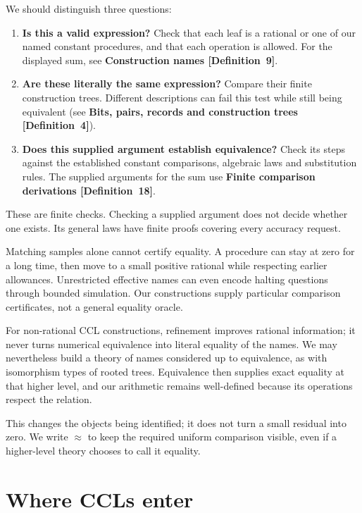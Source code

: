 \documentclass[11pt]{article}
\newcommand{\entryname}[3]{\textbf{#3 \mbox{[#1~#2]}}}
\begin{document}
\begingroup\samepage
We should distinguish three questions:
\begin{enumerate}
\item \textbf{Is this a valid expression?} Check that each leaf is a rational
or one of our named constant procedures, and that each operation is allowed.
For the displayed sum, see \entryname{Definition}{9}{Construction names}.
\item \textbf{Are these literally the same expression?} Compare their finite
construction trees. Different descriptions can fail this test while still
being equivalent (see \entryname{Definition}{4}{Bits, pairs, records and construction trees}).
\item \textbf{Does this supplied argument establish equivalence?} Check its
steps against the established constant comparisons, algebraic laws and
substitution rules. The supplied arguments for the sum use
\entryname{Definition}{18}{Finite comparison derivations}.
\end{enumerate}
\par\endgroup
These are finite checks. Checking a supplied argument does not decide
whether one exists. Its general laws have finite proofs covering every
accuracy request.

Matching samples alone cannot certify equality. A procedure can stay at
zero for a long time, then move to a small positive rational while respecting
earlier allowances. Unrestricted effective names can even encode halting
questions through bounded simulation. Our constructions supply particular
comparison certificates, not a general equality oracle.

For non-rational CCL constructions, refinement improves rational information;
it never turns numerical equivalence into literal equality of the names.
We may nevertheless build a theory of names considered up to equivalence,
as with isomorphism types of rooted trees. Equivalence then supplies exact
equality at that higher level, and our arithmetic remains well-defined
because its operations respect the relation.

This changes the objects being identified; it does not turn a small residual
into zero. We write $\approx$ to keep the required uniform comparison visible,
even if a higher-level theory chooses to call it equality.

\section{Where CCLs enter}\label{sec:ccl}
\end{document}
